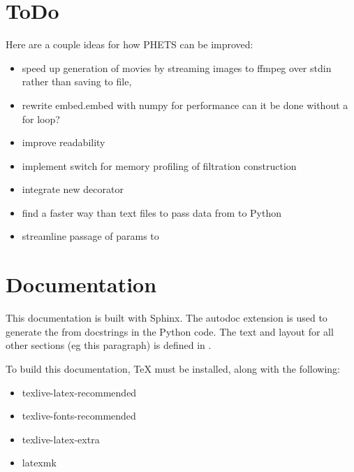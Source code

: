 \documentclass[letterpaper,10pt,openany,oneside,english]{sphinxmanual}
\begin{document}
\chapter{ToDo}
\label{\detokenize{index:todo}}
Here are a couple ideas for how PHETS can be improved:
\begin{itemize}
\item {} 
speed up generation of movies by streaming images to ffmpeg over stdin rather than saving to file, 

\item {} 
rewrite embed.embed with numpy for performance \textendash{} can it be done without a for loop?

\item {} 
improve  readability

\item {} 
implement switch for memory profiling of filtration construction

\item {} 
integrate new  decorator

\item {} 
find a faster way than text files to pass data from  to Python

\item {} 
streamline passage of params to 

\end{itemize}


\chapter{Documentation}
\label{\detokenize{index:documentation}}
This documentation is built with Sphinx. The autodoc extension is used to
generate the  from docstrings in the Python
code. The text and layout for all other sections (eg this paragraph) is defined
in .

To build this documentation, TeX must be installed, along with the following:
\begin{itemize}
\item {} 
texlive-latex-recommended

\item {} 
texlive-fonts-recommended

\item {} 
texlive-latex-extra

\item {} 
latexmk

\end{itemize}
\end{document}
